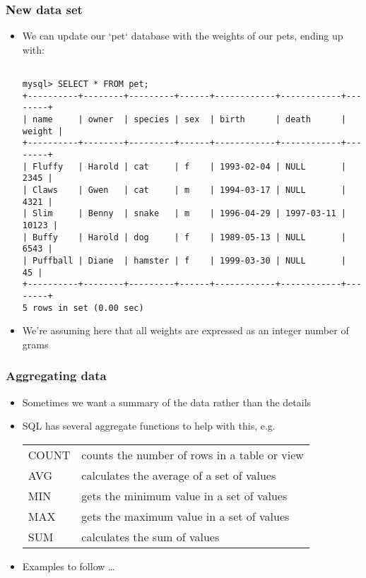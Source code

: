 \documentclass[hyperref={pdfpagelabels=false},svgnames,xcolor=table]{beamer}
\begin{document}
\begin{frame}[shrink=10,fragile]
  \frametitle{New data set}
  \begin{itemize}
    \item We can update our `pet` database with the weights of our pets,
      ending up with:
      \begin{scriptsize}
\begin{verbatim}

mysql> SELECT * FROM pet;
+----------+--------+---------+------+------------+------------+--------+
| name     | owner  | species | sex  | birth      | death      | weight |
+----------+--------+---------+------+------------+------------+--------+
| Fluffy   | Harold | cat     | f    | 1993-02-04 | NULL       |   2345 |
| Claws    | Gwen   | cat     | m    | 1994-03-17 | NULL       |   4321 |
| Slim     | Benny  | snake   | m    | 1996-04-29 | 1997-03-11 |  10123 |
| Buffy    | Harold | dog     | f    | 1989-05-13 | NULL       |   6543 |
| Puffball | Diane  | hamster | f    | 1999-03-30 | NULL       |     45 |
+----------+--------+---------+------+------------+------------+--------+
5 rows in set (0.00 sec)

\end{verbatim}
      \end{scriptsize}
    \item We're assuming here that all weights are expressed as an integer 
      number of grams
  \end{itemize}
\end{frame}

\begin{frame}
  \frametitle{Aggregating data}
  \begin{itemize}
    \item Sometimes we want a summary of the data rather than the details 
    \item SQL has several aggregate functions to help with this, e.g. \\
      \begin{tabular}{>{\color{blue}}lp{}}
        COUNT & counts the number of rows in a table or view \\
        AVG & calculates the average of a set of values \\
        MIN & gets the minimum value in a set of values \\
        MAX & gets the maximum value in a set of values \\
        SUM & calculates the sum of values
      \end{tabular}
    \item Examples to follow \ldots
  \end{itemize}
\end{frame}
\end{document}
